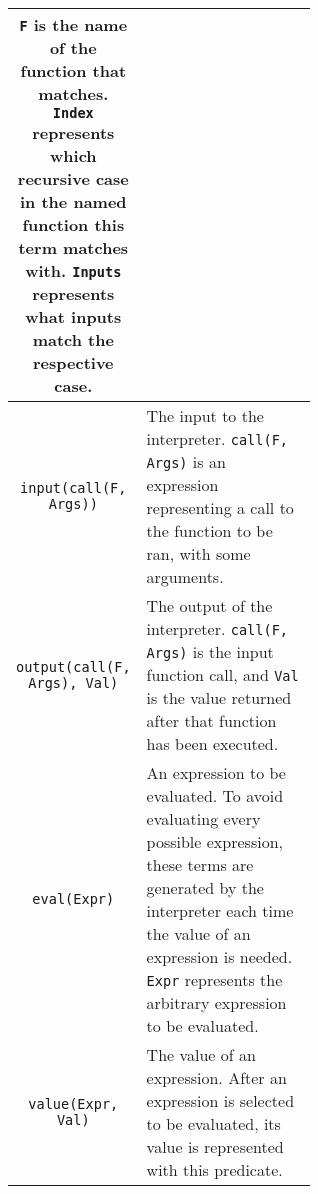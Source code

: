 \begin{center}
\begin{tabular}{| c | m{0.6\linewidth} |}
\lstinline!F! is the name of the function that matches. \newline
\lstinline!Index! represents which recursive case in the named function this term matches with. \newline
\lstinline!Inputs! represents what inputs match the respective case.\newline
\\
\hline
\lstinline!input(call(F, Args))!
&
\mbox{}\newline
The input to the interpreter. \lstinline!call(F, Args)! is an expression representing a call to the function to be ran, with some arguments. \newline
\\
\hline
\lstinline!output(call(F, Args), Val)! 
& 
\mbox{}\newline
The output of the interpreter. \lstinline!call(F, Args)! is the input function call, and \lstinline!Val! is the value returned after that function has been executed. \newline
\\
\hline
\lstinline!eval(Expr)! 
& 
\mbox{}\newline
An expression to be evaluated. To avoid evaluating every possible expression, these terms are generated by the interpreter each time the value of an expression is needed. \newline
\lstinline!Expr! represents the arbitrary expression to be evaluated. \newline 
\\
\hline
\lstinline!value(Expr, Val)! 
& 
\mbox{}\newline
The value of an expression. After an expression is selected to be evaluated, its value is represented with this predicate.\newline 
\\
\hline
\end{tabular}
\end{center}
 
